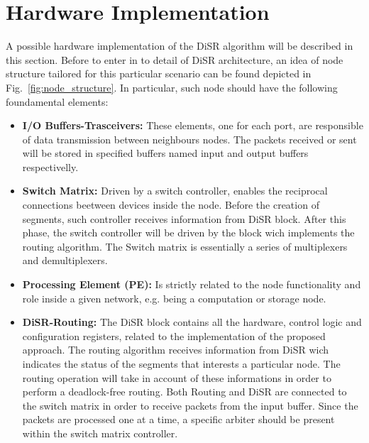 \section{Hardware Implementation}
\label{sec:implementation}

A possible hardware implementation of the DiSR algorithm will be
described in this section.  Before to enter in to detail of  DiSR
architecture,  an idea of node structure tailored for this particular
scenario can be found depicted in Fig.~\ref{fig:node_structure}. In
particular, such node should have the following foundamental elements:

\begin{itemize}%

	\item \textbf{I/O Buffers-Trasceivers:} These elements, one for
	each port,  are responsible of data transmission between neighbours
	nodes. The packets received or sent will be stored in specified buffers
	named input and output buffers respectivelly.

	\item \textbf{Switch Matrix:} Driven by a switch controller, enables the
	reciprocal connections beetween		 devices inside the node. Before
	the creation of segments, such controller receives information from
	DiSR block.  After this phase, the switch controller will be driven by
	the block wich implements the routing algorithm. The Switch matrix is
	essentially a series of multiplexers and demultiplexers.

	\item  \textbf{Processing Element (PE):} Is strictly related to the node
	functionality  and role inside a given network, e.g. being a
	computation or storage node.

	\item \textbf{DiSR-Routing:} The DiSR block contains all the hardware, control
	logic and configuration registers, related to the implementation of the
	proposed approach. The routing algorithm receives information
	from DiSR  wich indicates the status of the segments that interests a
	particular node. The routing operation will take in account of these
	informations in order to perform a deadlock-free routing. Both Routing
	and DiSR are connected to the switch matrix in order to receive
	packets from the input buffer. Since the packets are processed one at
	a time, a specific arbiter should be present within the switch matrix
	controller. 

\end{itemize}%

